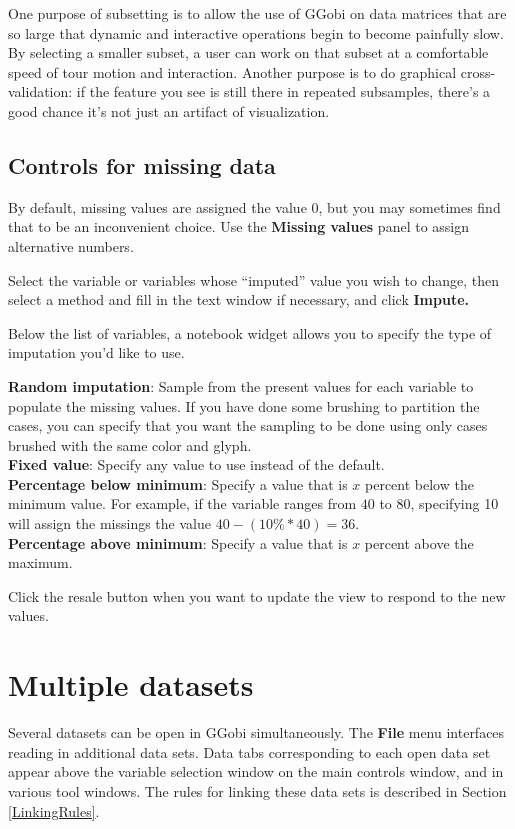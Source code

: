 \documentclass[11pt]{article}
\begin{document}
One purpose of subsetting is to allow the use of GGobi on data matrices
that are so large that dynamic and interactive operations begin to
become painfully slow.  By selecting a smaller subset, a user can
work on that subset at a comfortable speed of tour motion and
interaction.  Another purpose is to do graphical cross-validation:
if the feature you see is still there in repeated subsamples, there's
a good chance it's not just an artifact of visualization.

\subsection{Controls for missing data}
%
By default, missing values are assigned the value $0$, but you
may sometimes find that to be an inconvenient choice.  Use the
{\bf Missing values} panel to assign alternative numbers.

Select the variable or variables whose ``imputed'' value you
wish to change, then select a method and fill in the text window
if necessary, and click {\bf Impute.}

Below the list of variables, a notebook widget allows you to specify
the type of imputation you'd like to use.

{\bf Random imputation}: Sample from the present values for each variable
  to populate the missing values.  If you have done some brushing to
  partition the cases, you can specify that you want the sampling to be
  done using only cases brushed with the same color and glyph.
\\{\bf Fixed value}: Specify any value to use instead of the default.
\\{\bf Percentage below minimum}: Specify a value that is $x$ percent
  below the minimum value.  For example, if the variable ranges from
 $40$ to $80$, specifying 10 will assign the missings the value $40 - (10\%
 * 40) = 36$.
\\{\bf Percentage above minimum}: Specify a value that is $x$ percent
above the maximum.

Click the resale button when you want to update the view to
respond to the new values.

%
%

\section{Multiple datasets}

Several datasets can be open in GGobi simultaneously. The {\bf File}
menu interfaces reading in additional data sets. Data tabs corresponding
to each open data set appear above the variable selection window on
the main controls window, and in various tool windows. The rules for
linking these data sets is described in Section \ref{LinkingRules}.
\end{document}
